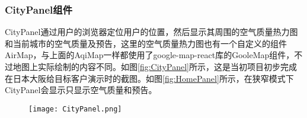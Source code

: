 \subsubsection{CityPanel组件}
CityPanel通过用户的浏览器定位用户的位置，然后显示其周围的空气质量热力图和当前城市的空气质量及预告，这里的空气质量热力图也有一个自定义的组件AirMap，与上面的AqiMap一样都使用了google-map-react库的GooleMap组件，不过地图上实际绘制的内容不同。如图\ref{fig:CityPanel}所示，这是当初项目初步完成在日本大阪给目标客户演示时的截图。如图\ref{fig:HomePanel}所示，在狭窄模式下CityPanel会显示只显示空气质量和预告。
\begin{figure}[!htp]
 \centering
 \texttt{[image: CityPanel.png]}
\end{figure} 
